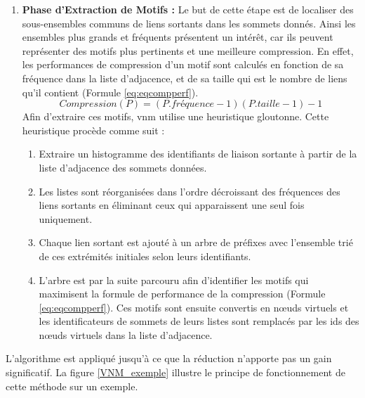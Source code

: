 \begin{enumerate}
					\item \textbf{Phase d'Extraction de Motifs :}				Le but de cette étape est de localiser des sous-ensembles communs de liens sortants dans les sommets donnés. 
				Ainsi les ensembles plus grands et fréquents présentent un intérêt, car ils peuvent représenter des motifs plus pertinents et une meilleure compression. En effet, les performances de compression d'un motif sont calculés en fonction de sa fréquence dans la liste d'adjacence, et de sa taille qui est le nombre de liens qu'il contient (Formule \ref{eq:eqcompperf}).
				\begin{equation}
				Compression(P)=(P.fréquence-1)(P.taille-1)-1
				\label{eq:eqcompperf}
				\end{equation}
				Afin d'extraire ces motifs, \gls{vnm}  utilise une heuristique gloutonne. Cette heuristique procède comme suit :
				\begin{enumerate}
				\item Extraire un histogramme des identifiants de liaison sortante à partir de la liste d'adjacence des sommets données.
				\item Les listes sont réorganisées dans l'ordre décroissant des fréquences des liens sortants en éliminant ceux qui apparaissent une seul fois uniquement.
				\item Chaque lien sortant est ajouté à un arbre de préfixes avec l'ensemble trié de ces extrémités initiales selon leurs identifiants. 
				\item L'arbre est par la suite parcouru afin d'identifier les motifs qui maximisent la formule de performance de la compression (Formule \ref{eq:eqcompperf}). Ces motifs sont ensuite convertis en nœuds virtuels et les identificateurs de sommets de leurs listes sont remplacés par les ids des nœuds virtuels dans la liste d'adjacence.
				\end{enumerate}
				 
				\end{enumerate}
				
				L'algorithme est appliqué jusqu'à ce que la réduction n'apporte pas un gain significatif. La figure \ref{VNM_exemple} illustre le principe de fonctionnement de cette méthode sur un exemple.
				
				
		

